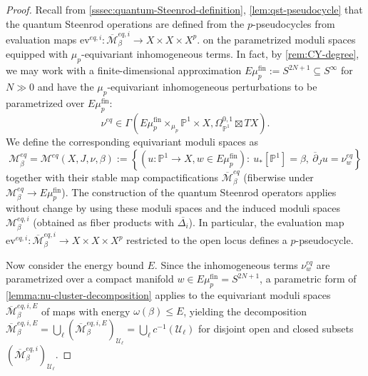 \documentclass[reqno]{amsart}
\numberwithin{equation}{section}
\numberwithin{equation}{section}
\numberwithin{equation}{section}
\theoremstyle{definition}
\theoremstyle{remark}
\theoremstyle{remark}
\newcommand{\ov}{\overline}
\begin{document}
\begin{proof}
    Recall from \cref{sssec:quantum-Steenrod-definition}, \cref{lem:qst-pseudocycle} that the quantum Steenrod operations are defined from the $p$-pseudocycles from evaluation maps  $\mathrm{ev}^{eq, i}: \ov{\mathcal{M}}^{eq, i}_\beta \to X \times X \times X^p$.
    on the parametrized moduli spaces equipped with $\mu_p$-equivariant inhomogeneous terms. In fact, by \cref{rem:CY-degree}, we may work with a finite-dimensional approximation $E\mu_p^{\mathrm{fin}} := S^{2N+1} \subseteq S^\infty$ for $N \gg 0$ and have the $\mu_p$-equivariant inhomogeneous perturbations to be parametrized over $E\mu_p^{\mathrm{fin}}$:
    \begin{equation}
        \nu^{eq} \in \Gamma ( E\mu_p^{\mathrm{fin}} \times_{\mu_p} \mathbb{P}^1 \times X , \Omega_{\mathbb{P}^1}^{0,1} \boxtimes TX).
    \end{equation}
    We define the corresponding equivariant moduli spaces as
    \begin{equation}
        \mathcal{M}^{eq}_\beta = \mathcal{M}^{eq}(X, J, \nu, \beta) := \left \{ (u: \mathbb{P}^1 \to X, w \in E\mu_p^{\mathrm{fin}}) :\  u_*[\mathbb{P}^1] = \beta, \ \ov{\partial}_J u = \nu^{eq}_w\right\}
    \end{equation}
    together with their stable map compactifications $\ov{\mathcal{M}}^{eq}_{\beta}$ (fiberwise under $\mathcal{M}^{eq}_\beta \to E\mu_p^{\mathrm{fin}}$). The construction of the quantum Steenrod operators applies without change by using these moduli spaces and the induced moduli spaces $\mathcal{M}^{eq, i}_\beta$ (obtained as fiber products with $\ov{\Delta_i}$). In particular, the evaluation map $\mathrm{ev}^{eq, i} : \ov{\mathcal{M}}_\beta^{eq, i} \to X \times X \times X^p$ restricted to the open locus defines a $p$-pseudocycle. 


    Now consider the energy bound $E$. Since the inhomogeneous terms $\nu^{eq}_w$ are parametrized over a compact manifold $w \in E\mu_p^{\mathrm{fin}} = S^{2N+1}$, a parametric form of \cref{lemma:nu-cluster-decomposition} applies to the equivariant moduli spaces $\ov{\mathcal{M}}_\beta^{eq, i, E}$ of maps with energy $\omega(\beta) \le E$, yielding the decomposition $\ov{\mathcal{M}}_\beta^{eq, i, E} = \bigcup_\ell (\ov{\mathcal{M}}_\beta^{eq, i, E})_{\mathcal{U}_\ell} = \bigcup_{\ell} c^{-1}(\mathcal{U}_\ell)$ for disjoint open and closed subsets $(\ov{\mathcal{M}}_\beta^{eq, i})_{\mathcal{U}_\ell} $. 
    

\end{proof}
\end{document}
